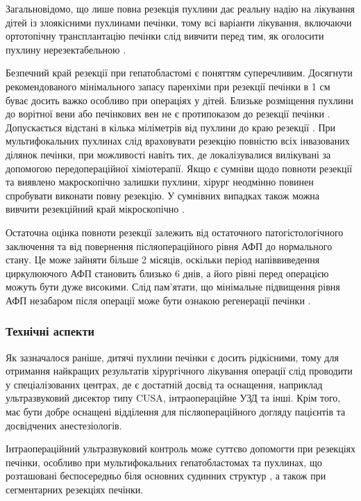 Загальновідомо, що лише повна резекція пухлини дає реальну надію на лікування дітей із злоякісними пухлинами печінки, тому всі варіанти лікування, включаючи ортотопічну трансплантацію печінки слід вивчити перед тим, як оголосити пухлину нерезектабельною \cite{pmid31718024}. 

Безпечний край резекції при гепатобластомі є поняттям суперечливим. Досягнути рекомендованого мінімального запасу паренхіми при резекції печінки в 1 см буває досить важко особливо при операціях у дітей. Близьке розміщення пухлини до ворітної вени або печінкових вен не є протипоказом до резекції печінки \cite{pmid31931965}. Допускається відстані в кілька міліметрів від пухлини до краю резекції \cite{pmid32181433}. При мультифокальних пухлинах слід враховувати резекцію повністю всіх інвазованих ділянок печінки, при можливості навіть тих, де локалізувалися вилікувані за допомогою передопераційної хіміотерапії. Якщо є сумніви щодо повноти резекції та виявлено макроскопічно залишки пухлини, хірург неодмінно повинен спробувати виконати повну резекцію. У сумнівних випадках також можна вивчити резекційний край мікроскопічно \cite{pmid32421442}. 

Остаточна оцінка повноти резекції залежить від остаточного патогістологічного заключення та від повернення післяопераційного рівня АФП до нормального стану. Це може зайняти більше 2 місяців, оскільки період напіввиведення циркулюючого АФП становить близько 6 днів, а його рівні перед операцією можуть бути дуже високими. Слід пам’ятати, що мінімальне підвищення рівня АФП незабаром після операції може бути ознакою регенерації печінки \cite{pmid32458263}.
\subsubsection{Технічні аспекти}
Як зазначалося раніше, дитячі пухлини печінки є досить рідкісними, тому для отримання найкращих результатів хірургічного лікування операції слід проводити у спеціалізованих центрах, де є достатній досвід та оснащення, наприклад ультразвуковий дисектор типу CUSA, інтраопераційне УЗД та інші. Крім того, має бути добре оснащені відділення для післяопераційного догляду пацієнтів та досвідчених анестезіологів. 

Інтраопераційний ультразвуковий контроль може суттєво допомогти при резекціях печінки, особливо при мультифокальних гепатобластомах та пухлинах, що розташовані беспосередньо біля основних судинних структур \cite{pmid32603027}, а також при сегментарних резекціях печінки. 

